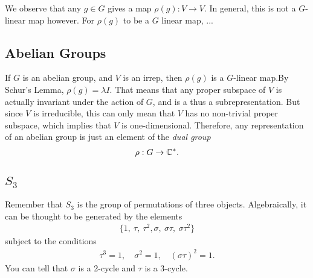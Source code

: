 We observe that any $g\in G$ gives a map $\rho(g): V\to V$. In general, this is not a $G$-linear map however. For $\rho(g)$ to be a $G$ linear map, ...

\subsection{Abelian Groups}
\label{sub:abelian_groups}

If $G$ is an abelian group, and $V$ is an irrep, then $\rho(g)$ is a $G$-linear map.By Schur's Lemma, $\rho(g)=\lambda I$. That means that any proper subspace of $V$ is actually invariant under the action of $G$, and is a thus a subrepresentation. But since $V$ is irreducible, this can only mean that $V$ has no non-trivial proper subspace, which implies that $V$ is one-dimensional. Therefore, any representation of an abelian group is just an element of the \emph{dual group}
\begin{align}
    \rho: G \to \mathbb{C}^*.
\end{align}


\subsection{\texorpdfstring{$S_3$}{S3}}

\begin{insight}
    Remember that $S_3$ is the group of permutations of three objects. Algebraically, it can be thought to be generated by the elements
    \begin{align}
        \{1,\ \tau,\ \tau^2, \sigma,\ \sigma\tau,\ \sigma\tau^2\}
    \end{align}
    subject to the conditions
    \begin{align}
        \tau^3=1,\quad \sigma^2=1,\quad (\sigma\tau)^2=1.
    \end{align}
    You can tell that $\sigma$ is a 2-cycle and $\tau$ is a 3-cycle.
    
\end{insight}

